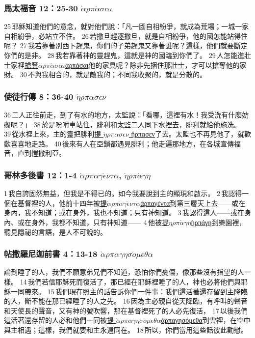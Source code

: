 \subsubsection{馬太福音 12：25-30 $\grave{\alpha}$$\rho$$\pi$$\acute{\alpha}$$\sigma$$\alpha$$\iota$}
25 耶穌知道他們的意念，就對他們說：「凡一國自相紛爭，就成為荒場；一城一家自相紛爭，必站立不住。 26 若撒旦趕逐撒旦，就是自相紛爭，他的國怎能站得住呢？ 27 我若靠著別西卜趕鬼，你們的子弟趕鬼又靠著誰呢？這樣，他們就要斷定你們的是非。 28 我若靠著神的靈趕鬼，這就是神的國臨到你們了。 29 人怎能進壯士家裡\underline{搶奪$\grave{\alpha}$$\rho$$\pi$$\acute{\alpha}$$\sigma$$\alpha$$\iota$ἁρπάσαι}他的家具呢？除非先捆住那壯士，才可以搶奪他的家財。 30 不與我相合的，就是敵我的；不同我收聚的，就是分散的。

\subsubsection{使徒行傳 8：36-40 $\acute{\eta}$$\rho$$\pi$$\alpha$$\sigma$$\epsilon$$\nu$}
36 二人正往前走，到了有水的地方，太監說：「看哪，這裡有水！我受洗有什麼妨礙呢？」 38 於是吩咐車站住，腓利和太監二人同下水裡去，腓利就給他施洗。 39 從水裡上來，主的靈把腓利\underline{提 $\acute{\eta}$$\rho$$\pi$$\alpha$$\sigma$$\epsilon$$\nu$ ἥρπασεν}了去。太監也不再見他了，就歡歡喜喜地走路。 40 後來有人在亞鎖都遇見腓利；他走遍那地方，在各城宣傳福音，直到愷撒利亞。

\subsubsection{哥林多後書 12：1-4 $\grave{\alpha}$$\rho$$\pi$$\alpha$$\gamma$$\acute{\epsilon}$$\nu$$\tau$$\alpha$, $\grave{\eta}$$\rho$$\pi$$\acute{\alpha}$$\gamma$$\eta$}
1 我自誇固然無益，但我是不得已的。如今我要說到主的顯現和啟示。 2 我認得一個在基督裡的人，他前十四年被\underline{提$\grave{\alpha}$$\rho$$\pi$$\alpha$$\gamma$$\acute{\epsilon}$$\nu$$\tau$$\alpha$ἁρπαγέντα}到第三層天上去——或在身內，我不知道；或在身外，我也不知道；只有神知道。 3 我認得這人——或在身內、或在身外，我都不知道，只有神知道—— 4 他被\underline{提$\grave{\eta}$$\rho$$\pi$$\acute{\alpha}$$\gamma$$\eta$ἡρπάγη}到樂園裡，聽見隱祕的言語，是人不可說的。

\subsubsection{帖撒羅尼迦前書 4：13-18 $\grave{\alpha}$$\rho$$\pi$$\alpha$$\gamma$$\eta$$\sigma$$\acute{o}$$\mu$$\epsilon$$\theta$$\alpha$}
論到睡了的人，我們不願意弟兄們不知道，恐怕你們憂傷，像那些沒有指望的人一樣。 14 我們若信耶穌死而復活了，那已經在耶穌裡睡了的人，神也必將他們與耶穌一同帶來。 15 我們現在照主的話告訴你們一件事：我們這活著還存留到主降臨的人，斷不能在那已經睡了的人之先。 16 因為主必親自從天降臨，有呼叫的聲音和天使長的聲音，又有神的號吹響，那在基督裡死了的人必先復活， 17 以後我們這活著還存留的人必和他們一同被\underline{提 $\grave{\alpha}$$\rho$$\pi$$\alpha$$\gamma$$\eta$$\sigma$$\acute{o}$$\mu$$\epsilon$$\theta$$\alpha$ἁρπαγησόμεθα}到雲裡，在空中與主相遇；這樣，我們就要和主永遠同在。 18 所以，你們當用這些話彼此勸慰。


